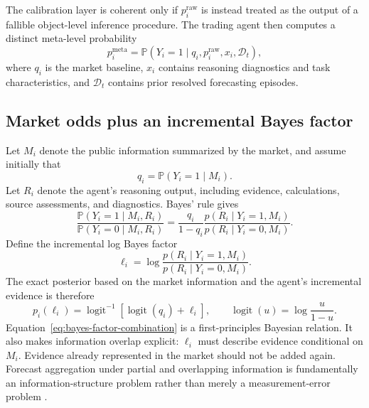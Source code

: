 \documentclass[journal,a4paper]{IEEEtran}
\newcommand{\Prb}{\mathbb{P}}
\newcommand{\sigmoid}{\operatorname{logit}^{-1}}
\newcommand{\logit}{\operatorname{logit}}
\begin{document}
The calibration layer is coherent only if $p_i^{\mathrm{raw}}$ is instead treated as the output of a fallible object-level inference procedure. The trading agent then computes a distinct meta-level probability
\begin{equation}
p_i^{\mathrm{meta}}
=
\Prb(Y_i=1\mid q_i,p_i^{\mathrm{raw}},x_i,\mathcal{D}_t),
\end{equation}
where $q_i$ is the market baseline, $x_i$ contains reasoning diagnostics and task characteristics, and $\mathcal{D}_t$ contains prior resolved forecasting episodes.

\subsection{Market odds plus an incremental Bayes factor}
Let $M_i$ denote the public information summarized by the market, and assume initially that
\begin{equation}
q_i=\Prb(Y_i=1\mid M_i).
\label{eq:market-baseline}
\end{equation}
Let $R_i$ denote the agent's reasoning output, including evidence, calculations, source assessments, and diagnostics. Bayes' rule gives
\begin{equation}
\frac{\Prb(Y_i=1\mid M_i,R_i)}{\Prb(Y_i=0\mid M_i,R_i)}
=
\frac{q_i}{1-q_i}
\frac{p(R_i\mid Y_i=1,M_i)}{p(R_i\mid Y_i=0,M_i)}.
\end{equation}
Define the incremental log Bayes factor
\begin{equation}
\ell_i
=
\log
\frac{p(R_i\mid Y_i=1,M_i)}{p(R_i\mid Y_i=0,M_i)}.
\label{eq:true-log-bf}
\end{equation}
The exact posterior based on the market information and the agent's incremental evidence is therefore
\begin{equation}
p_i(\ell_i)
=
\sigmoid\!\left[\logit(q_i)+\ell_i\right],
\qquad
\logit(u)=\log\frac{u}{1-u}.
\label{eq:bayes-factor-combination}
\end{equation}
Equation~\eqref{eq:bayes-factor-combination} is a first-principles Bayesian relation. It also makes information overlap explicit: $\ell_i$ must describe evidence conditional on $M_i$. Evidence already represented in the market should not be added again. Forecast aggregation under partial and overlapping information is fundamentally an information-structure problem rather than merely a measurement-error problem \cite{satopaa2015,babichenko2018,lichtendahl2017}.
\end{document}
